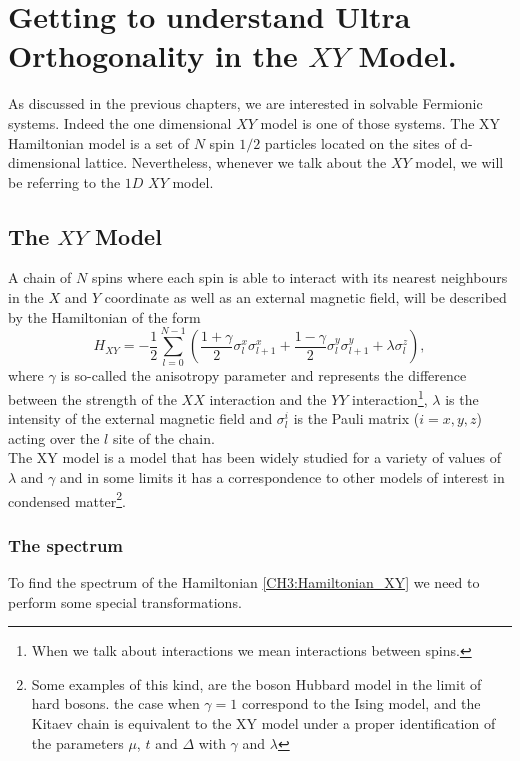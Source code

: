 \chapter{Getting to understand Ultra Orthogonality in the $XY$ Model.}

As discussed in the previous chapters, we are interested in solvable Fermionic systems. Indeed the one dimensional $XY$ model is one of those systems\cite{lieb_two_1961}. The XY Hamiltonian model is a set of $N$ spin $1/2$ particles 
located on the sites of d-dimensional lattice. Nevertheless, whenever we talk about the $XY$ model, we will be referring to the $1D$ $XY$ model.
\section{The $XY$ Model}
A chain of $N$ spins where each spin is able to interact with its nearest neighbours in the $X$ and $Y$ coordinate as well as an external magnetic field, will be described by the Hamiltonian of the form
\begin{equation}
H_{X Y}=-\frac{1}{2} \sum_{l=0}^{N-1}\left(\frac{1+\gamma}{2} \sigma_{l}^{x} \sigma_{l+1}^{x}+\frac{1-\gamma}{2} \sigma_{l}^{y} \sigma_{l+1}^{y}+\lambda \sigma_{l}^{z}\right),
\label{CH3:Hamiltonian_XY}
\end{equation}
where $\gamma$ is so-called the anisotropy parameter and represents the difference between the strength of the $XX$ interaction and the $YY$ interaction\footnote{When we talk about interactions we mean interactions between spins.}, $\lambda$ is the intensity of the external magnetic field and $\sigma^{i}_{l}$ is the Pauli matrix ($i= x,y,z$) acting over the $l$ site of the chain.\\
The XY model is a model that has been widely studied for a variety of values of $\lambda$ and $\gamma$ and in some limits it has a correspondence to other models of interest in condensed matter\cite{katsura_statistical_1962,barouch_statistical_1971,barouch_statistical_1970}\footnote{Some examples of this kind, are the boson Hubbard model in the limit of hard bosons. the case when $\gamma=1$ correspond to the Ising model, and the Kitaev chain is equivalent to the XY model under a proper identification of the parameters $\mu$, $t$ and $\Delta$ with $\gamma$ and $\lambda$\cite{katsura_statistical_1962,barouch_statistical_1971}}.
\subsection{The spectrum}
To find the spectrum of the Hamiltonian \eqref{CH3:Hamiltonian_XY} we need to perform some special transformations.
